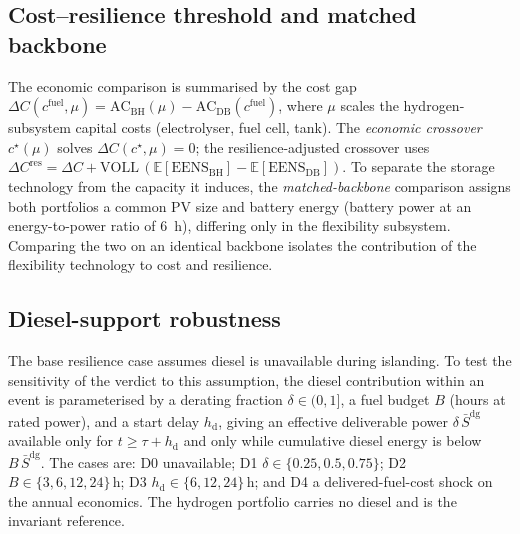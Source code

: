 \documentclass[preprint,12pt]{elsarticle}
\begin{document}
\subsection{Cost--resilience threshold and matched backbone}
\label{sub:thresh}
The economic comparison is summarised by the cost gap
$\Delta C(c^{\mathrm{fuel}},\mu) = \mathrm{AC}_{\mathrm{BH}}(\mu) - \mathrm{AC}_{\mathrm{DB}}(c^{\mathrm{fuel}})$,
where $\mu$ scales the hydrogen-subsystem capital costs (electrolyser, fuel cell,
tank). The \emph{economic crossover} $c^{\star}(\mu)$ solves
$\Delta C(c^{\star},\mu)=0$; the resilience-adjusted crossover uses
$\Delta C^{\mathrm{res}} = \Delta C + \mathrm{VOLL}\,(\mathbb{E}[\mathrm{EENS}_{\mathrm{BH}}]-\mathbb{E}[\mathrm{EENS}_{\mathrm{DB}}])$.
To separate the storage technology from the capacity it induces, the
\emph{matched-backbone} comparison assigns both portfolios a common PV size and
battery energy (battery power at an energy-to-power ratio of 6~h), differing only
in the flexibility subsystem. Comparing the two on an identical backbone isolates
the contribution of the flexibility technology to cost and resilience.

\subsection{Diesel-support robustness}
\label{sub:robust}
The base resilience case assumes diesel is unavailable during islanding. To test
the sensitivity of the verdict to this assumption, the diesel contribution within
an event is parameterised by a derating fraction $\delta\in(0,1]$, a fuel budget
$B$ (hours at rated power), and a start delay $h_{\mathrm d}$, giving an effective
deliverable power $\delta\,\bar S^{\mathrm{dg}}$ available only for
$t\ge \tau+h_{\mathrm d}$ and only while cumulative diesel energy is below
$B\,\bar S^{\mathrm{dg}}$. The cases are: D0 unavailable; D1
$\delta\in\{0.25,0.5,0.75\}$; D2 $B\in\{3,6,12,24\}\,\mathrm{h}$; D3
$h_{\mathrm d}\in\{6,12,24\}\,\mathrm{h}$; and D4 a delivered-fuel-cost shock on
the annual economics. The hydrogen portfolio carries no diesel and is the
invariant reference.
\end{document}
